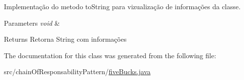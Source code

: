 Implementação do metodo to\+String para vizualização de informações da classe. 


\begin{DoxyParams}{Parameters}
{\em void} & \\
\hline
\end{DoxyParams}
\begin{DoxyReturn}{Returns}
Retorna String com informações 
\end{DoxyReturn}


The documentation for this class was generated from the following file\+:\begin{DoxyCompactItemize}
\item 
src/chain\+Of\+Responsability\+Pattern/\mbox{\hyperlink{five_bucks_8java}{five\+Bucks.\+java}}\end{DoxyCompactItemize}
